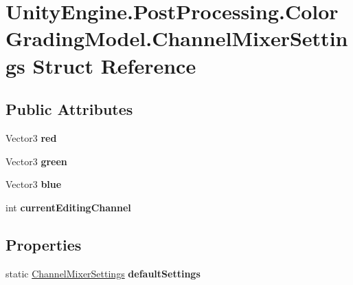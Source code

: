 \hypertarget{struct_unity_engine_1_1_post_processing_1_1_color_grading_model_1_1_channel_mixer_settings}{}\section{Unity\+Engine.\+Post\+Processing.\+Color\+Grading\+Model.\+Channel\+Mixer\+Settings Struct Reference}
\label{struct_unity_engine_1_1_post_processing_1_1_color_grading_model_1_1_channel_mixer_settings}
\subsection*{Public Attributes}
\begin{DoxyCompactItemize}
\item 
\mbox{\label{struct_unity_engine_1_1_post_processing_1_1_color_grading_model_1_1_channel_mixer_settings_a6d3b0a112b49bce65c7d446d51ef979e}} 
Vector3 {\bfseries red}
\item 
\mbox{\label{struct_unity_engine_1_1_post_processing_1_1_color_grading_model_1_1_channel_mixer_settings_a12e1143ea697393dcd4654928337c614}} 
Vector3 {\bfseries green}
\item 
\mbox{\label{struct_unity_engine_1_1_post_processing_1_1_color_grading_model_1_1_channel_mixer_settings_a214cd1df255d947d655f12edcc4b1f50}} 
Vector3 {\bfseries blue}
\item 
\mbox{\label{struct_unity_engine_1_1_post_processing_1_1_color_grading_model_1_1_channel_mixer_settings_a597fd37dc19eb835337e0a47bd4484b6}} 
int {\bfseries current\+Editing\+Channel}
\end{DoxyCompactItemize}
\subsection*{Properties}
\begin{DoxyCompactItemize}
\item 
\mbox{\label{struct_unity_engine_1_1_post_processing_1_1_color_grading_model_1_1_channel_mixer_settings_ae6c4d9717f045356da630f9a3d75b78d}} 
static \hyperlink{struct_unity_engine_1_1_post_processing_1_1_color_grading_model_1_1_channel_mixer_settings}{Channel\+Mixer\+Settings} {\bfseries default\+Settings}
\end{DoxyCompactItemize}


